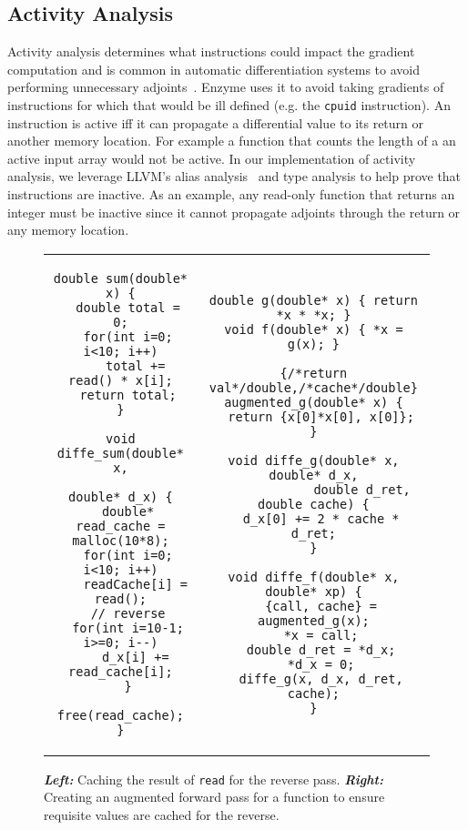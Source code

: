 \subsection{Activity Analysis}
Activity analysis determines what instructions could impact the gradient computation and is common in automatic differentiation systems to avoid performing unnecessary adjoints~\cite{shin2007comparison}. Enzyme uses it to avoid taking gradients of instructions for which that would be ill defined (e.g. the \texttt{cpuid} instruction). An instruction is active iff it can propagate a differential value to its return or another memory location. For example a function that counts the length of a an active input array would not be active. In our implementation of activity analysis, we leverage LLVM's alias analysis~\cite[Ch.~12]{AhoLaSe06} and type analysis to help prove that instructions are inactive. As an example, any read-only function that returns an integer must be inactive since it cannot propagate adjoints through the return or any memory location.

\begin{figure}
\centering
\begin{tabular}{c|c}
\begin{minipage}[T]{0.42\linewidth}
\begin{verbatim}
double sum(double* x) {
  double total = 0;
  for(int i=0; i<10; i++)
    total += read() * x[i];
  return total;
}

void diffe_sum(double* x,
               double* d_x) {
  double* read_cache = malloc(10*8);
  for(int i=0; i<10; i++)
    readCache[i] = read();
  // reverse
  for(int i=10-1; i>=0; i--)
    d_x[i] += read_cache[i];
  }
  free(read_cache);
}
\end{verbatim}
\end{minipage}
&
\begin{minipage}[T]{0.57\linewidth}
\begin{verbatim}
double g(double* x) { return *x * *x; }
void f(double* x) { *x = g(x); }

{/*return val*/double,/*cache*/double}
augmented_g(double* x) {
  return {x[0]*x[0], x[0]};
}

void diffe_g(double* x, double* d_x,
             double d_ret, double cache) {
  d_x[0] += 2 * cache * d_ret;
}

void diffe_f(double* x, double* xp) {
  {call, cache} = augmented_g(x);
  *x = call;
  double d_ret = *d_x;
  *d_x = 0;
  diffe_g(x, d_x, d_ret, cache);
}
\end{verbatim}
\end{minipage}
\end{tabular}
\caption{ {\textbf{\textit{Left:}}} Caching the result of \texttt{read} for the reverse pass. {\textbf{\textit{Right:}}} Creating an augmented forward pass for a function to ensure requisite values are cached for the reverse. }
\label{fig:cache}
\end{figure}

